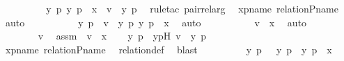 \begin{isabellebody}
\ \ \ \ \ \ \isamarkupfalse%
\ \isamarkupfalse%
\ {\isachardoublequoteopen}{\isasymexists}y\ p{\isachardot}{\kern0pt}\ {\isacharless}{\kern0pt}y{\isacharcomma}{\kern0pt}\ p{\isachargreater}{\kern0pt}\ {\isasymin}\ x\ {\isasymand}\ v\ {\isacharequal}{\kern0pt}\ {\isacharless}{\kern0pt}y{\isacharcomma}{\kern0pt}\ p{\isachargreater}{\kern0pt}{\isachardoublequoteclose}\ \isamarkupfalse%
\ {\isacharparenleft}{\kern0pt}rule{\isacharunderscore}{\kern0pt}tac\ pair{\isacharunderscore}{\kern0pt}rel{\isacharunderscore}{\kern0pt}arg{\isacharparenright}{\kern0pt}\ \isamarkupfalse%
\ xpname\ relation{\isacharunderscore}{\kern0pt}P{\isacharunderscore}{\kern0pt}name\ \isamarkupfalse%
\ auto\ \isanewline
\ \ \ \ \ \ \isamarkupfalse%
\ \isamarkupfalse%
\ y\ p\ \ {\isachardoublequoteopen}v\ {\isacharequal}{\kern0pt}\ {\isacharless}{\kern0pt}y{\isacharcomma}{\kern0pt}\ p{\isachargreater}{\kern0pt}{\isachardoublequoteclose}\ {\isachardoublequoteopen}{\isacharless}{\kern0pt}y{\isacharcomma}{\kern0pt}\ p{\isachargreater}{\kern0pt}\ {\isasymin}\ x{\isachardoublequoteclose}\ \isamarkupfalse%
\ auto\ \isanewline
\ \ \ \ \ \ \isamarkupfalse%
\ \isamarkupfalse%
\ {\isachardoublequoteopen}v\ {\isasymin}\ x{\isachardoublequoteclose}\ \isamarkupfalse%
\ auto\ \isanewline
\ \ \ \ \isamarkupfalse%
\ \isanewline
\ \ \ \ \ \ \isamarkupfalse%
\ v\ \isamarkupfalse%
\ assm\ {\isacharcolon}{\kern0pt}\ {\isachardoublequoteopen}v\ {\isasymin}\ x{\isachardoublequoteclose}\ \isamarkupfalse%
\ \isamarkupfalse%
\ y\ p\ \ ypH{\isacharcolon}{\kern0pt}\ {\isachardoublequoteopen}v\ {\isacharequal}{\kern0pt}\ {\isacharless}{\kern0pt}y{\isacharcomma}{\kern0pt}\ p{\isachargreater}{\kern0pt}{\isachardoublequoteclose}\ \isanewline
\ \ \ \ \ \ \ \ \isamarkupfalse%
\ xpname\ relation{\isacharunderscore}{\kern0pt}P{\isacharunderscore}{\kern0pt}name\ \isamarkupfalse%
\ relation{\isacharunderscore}{\kern0pt}def\ \isamarkupfalse%
\ blast\isanewline
\ \ \ \ \ \ \isamarkupfalse%
\ \isamarkupfalse%
\ {\isachardoublequoteopen}{\isacharless}{\kern0pt}y{\isacharcomma}{\kern0pt}\ p{\isachargreater}{\kern0pt}\ {\isasymin}\ {\isacharbraceleft}{\kern0pt}\ {\isacharless}{\kern0pt}y{\isacharcomma}{\kern0pt}\ p{\isachargreater}{\kern0pt}\ {\isachardot}{\kern0pt}\ {\isacharless}{\kern0pt}y{\isacharcomma}{\kern0pt}\ p{\isachargreater}{\kern0pt}\ {\isasymin}\ x\ {\isacharbraceright}{\kern0pt}{\isachardoublequoteclose}\ \isamarkupfalse%

\end{isabellebody}
